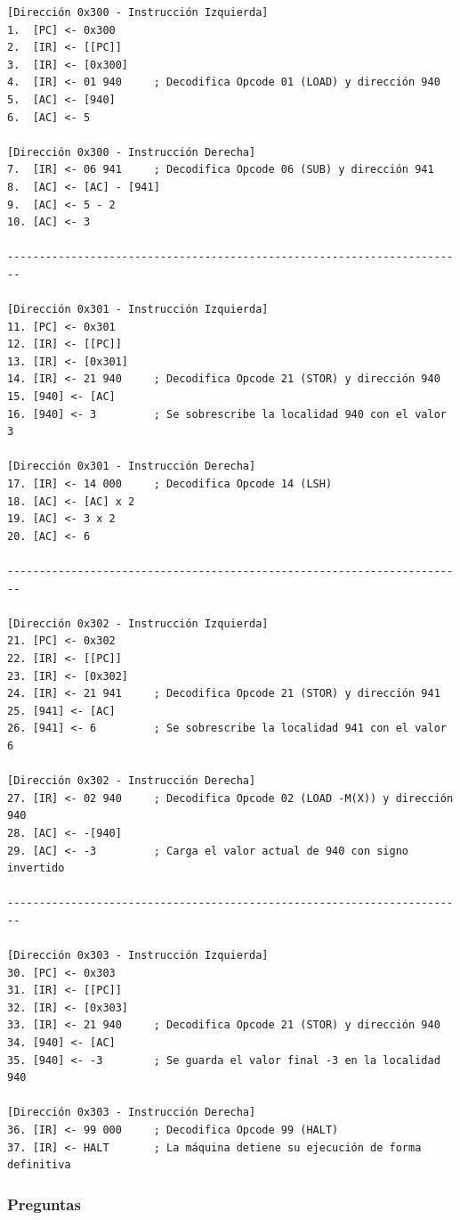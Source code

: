 \documentclass{article}
\begin{document}
\begin{verbatim}
[Dirección 0x300 - Instrucción Izquierda]
1.  [PC] <- 0x300
2.  [IR] <- [[PC]]
3.  [IR] <- [0x300]
4.  [IR] <- 01 940     ; Decodifica Opcode 01 (LOAD) y dirección 940
5.  [AC] <- [940]
6.  [AC] <- 5

[Dirección 0x300 - Instrucción Derecha]
7.  [IR] <- 06 941     ; Decodifica Opcode 06 (SUB) y dirección 941
8.  [AC] <- [AC] - [941]
9.  [AC] <- 5 - 2
10. [AC] <- 3

------------------------------------------------------------------------

[Dirección 0x301 - Instrucción Izquierda]
11. [PC] <- 0x301
12. [IR] <- [[PC]]
13. [IR] <- [0x301]
14. [IR] <- 21 940     ; Decodifica Opcode 21 (STOR) y dirección 940
15. [940] <- [AC]
16. [940] <- 3         ; Se sobrescribe la localidad 940 con el valor 3

[Dirección 0x301 - Instrucción Derecha]
17. [IR] <- 14 000     ; Decodifica Opcode 14 (LSH)
18. [AC] <- [AC] x 2
19. [AC] <- 3 x 2
20. [AC] <- 6

------------------------------------------------------------------------

[Dirección 0x302 - Instrucción Izquierda]
21. [PC] <- 0x302
22. [IR] <- [[PC]]
23. [IR] <- [0x302]
24. [IR] <- 21 941     ; Decodifica Opcode 21 (STOR) y dirección 941
25. [941] <- [AC]
26. [941] <- 6         ; Se sobrescribe la localidad 941 con el valor 6

[Dirección 0x302 - Instrucción Derecha]
27. [IR] <- 02 940     ; Decodifica Opcode 02 (LOAD -M(X)) y dirección 940
28. [AC] <- -[940]
29. [AC] <- -3         ; Carga el valor actual de 940 con signo invertido

------------------------------------------------------------------------

[Dirección 0x303 - Instrucción Izquierda]
30. [PC] <- 0x303
31. [IR] <- [[PC]]
32. [IR] <- [0x303]
33. [IR] <- 21 940     ; Decodifica Opcode 21 (STOR) y dirección 940
34. [940] <- [AC]
35. [940] <- -3        ; Se guarda el valor final -3 en la localidad 940

[Dirección 0x303 - Instrucción Derecha]
36. [IR] <- 99 000     ; Decodifica Opcode 99 (HALT)
37. [IR] <- HALT       ; La máquina detiene su ejecución de forma definitiva
\end{verbatim}

\subsubsection{Preguntas}
\label{sec:org8fb2990}
\end{document}
